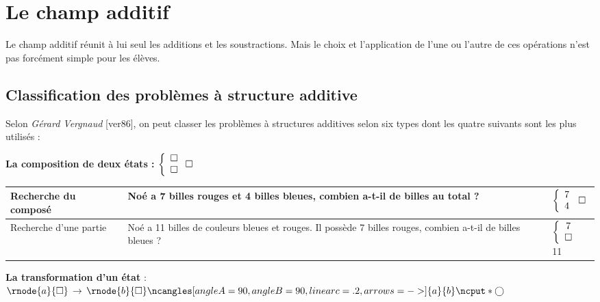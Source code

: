\vfill

\reperes

\section{Le champ additif}

Le champ additif réunit à lui seul les additions et les soustractions. Mais le choix et l'application de l'une ou l'autre de ces opérations n'est pas forcément simple pour les élèves.


\subsection{Classification des problèmes à structure additive} %

Selon {\it Gérard Vergnaud} [ver86], on peut classer les problèmes à structures additives selon six types dont les quatre suivants sont les plus utilisés :

{\bf La composition de deux états : $\left\{\begin{array}{cccc} \square\\ \square \end{array}\right.\square$}

   \begin{tabular}{|m{4.5cm}|m{9cm}|m{1.8cm}|}
      \hline
      Recherche du composé &
      Noé a 7 billes rouges et 4 billes bleues, combien a-t-il de billes au total ? &
      $\left\{\begin{array}{cccc} 7\\ 4 \end{array}\right.\,\square$ \\
      \hline
      Recherche d'une partie & Noé a 11 billes de couleurs bleues et rouges. Il possède 7 billes rouges, combien a-t-il de billes bleues ? & $\left\{\begin{array}{cccc} 7\\ \square \end{array}\right.$\,11 \\
      \hline
   \end{tabular}
      
\medskip
      
{\bf La transformation d'un état} : $\rnode{a}{\square}\,\to\,\rnode{b}{\square} \ncangles[angleA=90,angleB=90,linearc=.2,arrows=->]{a}{b} \ncput*{\bigcirc}$ \\ [-3mm]
   
